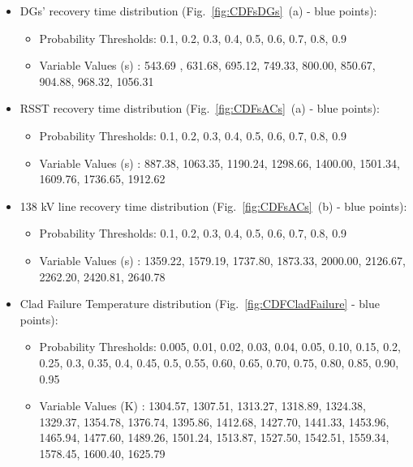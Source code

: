    \begin{itemize}
       \item DGs' recovery time distribution (Fig.~\ref{fig:CDFsDGs}~(a) - blue points):
       \begin{itemize}
            \item Probability Thresholds: 0.1, 0.2, 0.3, 0.4, 0.5, 0.6, 0.7, 0.8,  0.9
            \item Variable Values (s)           : 543.69 , 631.68, 695.12, 749.33, 800.00, 850.67, 904.88, 968.32, 1056.31
       \end{itemize}
       \item RSST recovery time distribution (Fig.~\ref{fig:CDFsACs}~(a) - blue points):
       \begin{itemize}
            \item Probability Thresholds:  0.1, 0.2,  0.3,  0.4, 0.5, 0.6, 0.7,  0.8,  0.9
            \item Variable Values (s)           :  887.38, 1063.35, 1190.24, 1298.66, 1400.00, 1501.34, 1609.76, 1736.65, 1912.62
       \end{itemize}
       \item 138 kV line recovery time distribution (Fig.~\ref{fig:CDFsACs}~(b) - blue points):
       \begin{itemize}
            \item Probability Thresholds: 0.1, 0.2, 0.3, 0.4, 0.5, 0.6, 0.7, 0.8, 0.9
            \item Variable Values (s)           : 1359.22,  1579.19,  1737.80, 1873.33,  2000.00,  2126.67, 2262.20,  2420.81, 2640.78
       \end{itemize}
       \item Clad Failure Temperature distribution (Fig.~\ref{fig:CDFCladFailure} - blue points):
       \begin{itemize}
            \item Probability Thresholds: 0.005, 0.01, 0.02, 0.03, 0.04, 0.05, 0.10, 0.15, 0.2, 0.25, 0.3, 0.35, 0.4, 0.45, 0.5, 0.55, 0.60, 0.65, 0.70, 0.75, 0.80, 0.85, 0.90, 0.95
            \item Variable Values (K)           : 1304.57, 1307.51, 1313.27, 1318.89, 1324.38, 1329.37, 1354.78, 1376.74, 1395.86, 1412.68, 1427.70, 1441.33, 1453.96, 1465.94, 1477.60, 1489.26, 1501.24, 1513.87, 1527.50, 	1542.51, 1559.34, 1578.45, 1600.40, 1625.79
    \end{itemize}
\end{itemize}
\vspace{-5mm}

